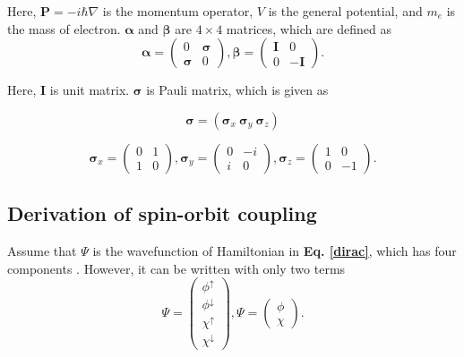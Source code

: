 \documentclass[a4paper, 12pt, titlepage,oneside,drop]{kthesis}
\begin{document}
\noindent Here, $\textbf{P} = -i\hbar \nabla $ is the momentum operator, $V$ is the general potential, and $m_e$ is the mass of electron. 
 $\boldsymbol{\alpha}$ and $\boldsymbol{\beta}$ are $4 \times 4$ matrices, which are defined as
\begin{equation}
 \boldsymbol{\alpha} = \left( \begin{array}{cc}
 0 & \boldsymbol{\sigma}  \\
 \boldsymbol{\sigma} & 0   \end{array} \right),
\boldsymbol{\beta} = \left( \begin{array}{ccc}
\boldsymbol{I} & 0\\
0 & -\boldsymbol{I}\end{array} \right).
\end{equation}

\noindent Here, $\boldsymbol{I}$ is unit matrix. $\boldsymbol{\sigma}$ is Pauli matrix, which is given as

\begin{equation} 
\boldsymbol{\sigma} = (\boldsymbol{\sigma}_x \  \boldsymbol{\sigma}_y \  \boldsymbol{\sigma}_z )  
\end{equation}

\begin{equation}
\boldsymbol{\sigma}_x = \left( \begin{array}{cc}
0 & 1\\
1 & 0\end{array} \right),
\boldsymbol{\sigma}_y = \left( \begin{array}{ccc}
0 & -i\\
i & 0\end{array} \right),
\boldsymbol{\sigma}_z = \left( \begin{array}{ccc}
1 & 0\\
0 & -1\end{array} \right).
\end{equation}

\subsection{Derivation of spin-orbit coupling}

\noindent  Assume that $\Psi$ is the wavefunction of Hamiltonian in \textbf{Eq. \ref{dirac}}, which has four components \cite{thaller1992dirac, dirac1930principles}. However, it can be 
written with only two terms
\begin{equation}\label{diracwf}
\Psi = \left( \begin{array}{c}
\phi^{\uparrow} \\
\phi^{\downarrow} \\
\chi^{\uparrow} \\
\chi^{\downarrow} \end{array} \right),
 \Psi = \left(\begin{array}{c}
\phi \\               
\chi \end{array} \right).
\end{equation}
\end{document}
